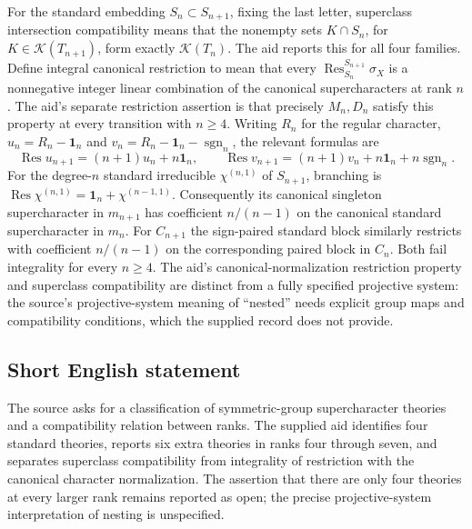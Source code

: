 \documentclass[11pt]{article}
\begin{document}
For the standard embedding $S_n\subset S_{n+1}$, fixing the last letter, superclass intersection compatibility means that the nonempty sets $K\cap S_n$, for $K\in\mathcal K(T_{n+1})$, form exactly $\mathcal K(T_n)$. The aid reports this for all four families. Define integral canonical restriction to mean that every $\operatorname{Res}^{S_{n+1}}_{S_n}\sigma_X$ is a nonnegative integer linear combination of the canonical supercharacters at rank $n$. The aid's separate restriction assertion is that precisely $M_n,D_n$ satisfy this property at every transition with $n\geq4$. Writing $R_n$ for the regular character, $u_n=R_n-\mathbf1_n$ and $v_n=R_n-\mathbf1_n-\operatorname{sgn}_n$, the relevant formulas are
\[
\operatorname{Res}u_{n+1}=(n+1)u_n+n\mathbf1_n,\qquad
\operatorname{Res}v_{n+1}=(n+1)v_n+n\mathbf1_n+n\operatorname{sgn}_n.
\]
For the degree-$n$ standard irreducible $\chi^{(n,1)}$ of $S_{n+1}$, branching is $\operatorname{Res}\chi^{(n,1)}=\mathbf1_n+\chi^{(n-1,1)}$. Consequently its canonical singleton supercharacter in $m_{n+1}$ has coefficient $n/(n-1)$ on the canonical standard supercharacter in $m_n$. For $C_{n+1}$ the sign-paired standard block similarly restricts with coefficient $n/(n-1)$ on the corresponding paired block in $C_n$. Both fail integrality for every $n\geq4$. The aid's canonical-normalization restriction property and superclass compatibility are distinct from a fully specified projective system: the source's projective-system meaning of ``nested'' needs explicit group maps and compatibility conditions, which the supplied record does not provide.
\subsection{Short English statement}
The source asks for a classification of symmetric-group supercharacter theories and a compatibility relation between ranks. The supplied aid identifies four standard theories, reports six extra theories in ranks four through seven, and separates superclass compatibility from integrality of restriction with the canonical character normalization. The assertion that there are only four theories at every larger rank remains reported as open; the precise projective-system interpretation of nesting is unspecified.
\end{document}
